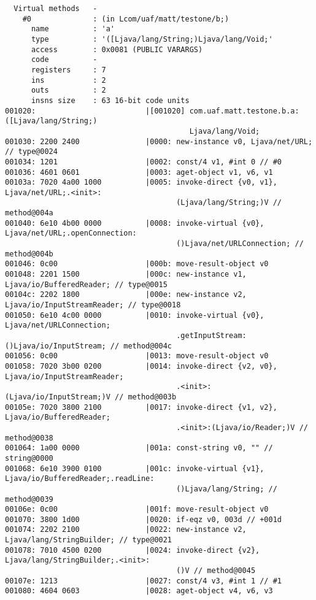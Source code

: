\begin{lstlisting}
  Virtual methods   -
    #0              : (in Lcom/uaf/matt/testone/b;)
      name          : 'a'
      type          : '([Ljava/lang/String;)Ljava/lang/Void;'
      access        : 0x0081 (PUBLIC VARARGS)
      code          -
      registers     : 7
      ins           : 2
      outs          : 2
      insns size    : 63 16-bit code units
001020:                         |[001020] com.uaf.matt.testone.b.a:([Ljava/lang/String;)
                                          Ljava/lang/Void;
001030: 2200 2400               |0000: new-instance v0, Ljava/net/URL; // type@0024
001034: 1201                    |0002: const/4 v1, #int 0 // #0
001036: 4601 0601               |0003: aget-object v1, v6, v1
00103a: 7020 4a00 1000          |0005: invoke-direct {v0, v1}, Ljava/net/URL;.<init>:
                                       (Ljava/lang/String;)V // method@004a
001040: 6e10 4b00 0000          |0008: invoke-virtual {v0}, Ljava/net/URL;.openConnection:
                                       ()Ljava/net/URLConnection; // method@004b
001046: 0c00                    |000b: move-result-object v0
001048: 2201 1500               |000c: new-instance v1, Ljava/io/BufferedReader; // type@0015
00104c: 2202 1800               |000e: new-instance v2, Ljava/io/InputStreamReader; // type@0018
001050: 6e10 4c00 0000          |0010: invoke-virtual {v0}, Ljava/net/URLConnection;
                                       .getInputStream:()Ljava/io/InputStream; // method@004c
001056: 0c00                    |0013: move-result-object v0
001058: 7020 3b00 0200          |0014: invoke-direct {v2, v0}, Ljava/io/InputStreamReader;
                                       .<init>:(Ljava/io/InputStream;)V // method@003b
00105e: 7020 3800 2100          |0017: invoke-direct {v1, v2}, Ljava/io/BufferedReader;
                                       .<init>:(Ljava/io/Reader;)V // method@0038
001064: 1a00 0000               |001a: const-string v0, "" // string@0000
001068: 6e10 3900 0100          |001c: invoke-virtual {v1}, Ljava/io/BufferedReader;.readLine:
                                       ()Ljava/lang/String; // method@0039
00106e: 0c00                    |001f: move-result-object v0
001070: 3800 1d00               |0020: if-eqz v0, 003d // +001d
001074: 2202 2100               |0022: new-instance v2, Ljava/lang/StringBuilder; // type@0021
001078: 7010 4500 0200          |0024: invoke-direct {v2}, Ljava/lang/StringBuilder;.<init>:
                                       ()V // method@0045
00107e: 1213                    |0027: const/4 v3, #int 1 // #1
001080: 4604 0603               |0028: aget-object v4, v6, v3

\end{lstlisting}
